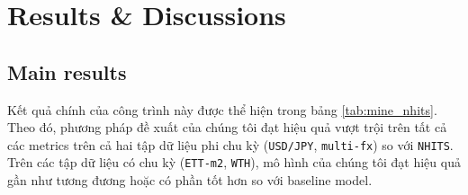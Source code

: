 
\chapter{Results \& Discussions}
\label{chap:result}


\section{Main results}

Kết quả chính của công trình này được thể hiện trong bảng \ref{tab:mine_nhits}. Theo đó, phương pháp đề xuất của chúng tôi đạt hiệu quả vượt trội trên tất cả các metrics trên cả hai tập dữ liệu phi chu kỳ (\verb|USD/JPY|, \verb|multi-fx|) so với \verb|NHITS|. Trên các tập dữ liệu có chu kỳ (\verb|ETT-m2|, \verb|WTH|), mô hình của chúng tôi đạt hiệu quả gần như tương đương hoặc có phần tốt hơn so với baseline model.

